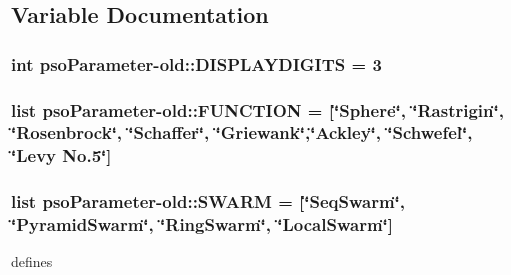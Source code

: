 \subsection{Variable Documentation}
\hypertarget{namespacepsoParameter-old_7c0ee668254cbad1c14422525b87d033}{
\subsubsection{\setlength{\rightskip}{0pt plus 5cm}int psoParameter-old::DISPLAYDIGITS = 3}}
\label{namespacepsoParameter-old_7c0ee668254cbad1c14422525b87d033}


\hypertarget{namespacepsoParameter-old_7c1abf2505a232031f1de65e28db72a1}{
\subsubsection{\setlength{\rightskip}{0pt plus 5cm}list psoParameter-old::FUNCTION = \mbox{[}\char`\"{}Sphere\char`\"{}, \char`\"{}{\bf Rastrigin}\char`\"{}, \char`\"{}{\bf Rosenbrock}\char`\"{}, \char`\"{}{\bf Schaffer}\char`\"{}, \char`\"{}{\bf Griewank}\char`\"{},\char`\"{}{\bf Ackley}\char`\"{}, \char`\"{}{\bf Schwefel}\char`\"{}, \char`\"{}Levy No.5\char`\"{}\mbox{]}}}
\label{namespacepsoParameter-old_7c1abf2505a232031f1de65e28db72a1}


\hypertarget{namespacepsoParameter-old_83f59ee3e05ee716f197192f202ede38}{
\subsubsection{\setlength{\rightskip}{0pt plus 5cm}list psoParameter-old::SWARM = \mbox{[}\char`\"{}SeqSwarm\char`\"{}, \char`\"{}{\bf PyramidSwarm}\char`\"{}, \char`\"{}{\bf RingSwarm}\char`\"{}, \char`\"{}{\bf LocalSwarm}\char`\"{}\mbox{]}}}
\label{namespacepsoParameter-old_83f59ee3e05ee716f197192f202ede38}


defines 

